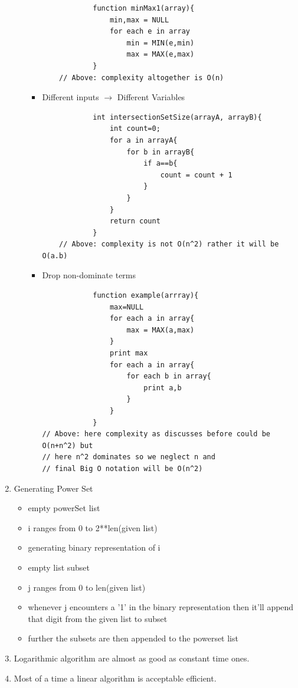 \documentclass[11pt]{article}
\begin{document}
\begin{enumerate}
\begin{itemize}
\begin{itemize}
\begin{verbatim}
            function minMax1(array){
                min,max = NULL
                for each e in array
                    min = MIN(e,min)
                    max = MAX(e,max)
            }
    // Above: complexity altogether is O(n)
                \end{verbatim}
                \item Different inputs $\rightarrow$ Different Variables
                \begin{verbatim}
            int intersectionSetSize(arrayA, arrayB){
                int count=0;
                for a in arrayA{
                    for b in arrayB{
                        if a==b{
                            count = count + 1
                        }
                    }
                }
                return count
            }
    // Above: complexity is not O(n^2) rather it will be O(a.b)
                \end{verbatim}
                \item Drop non-dominate terms
                \begin{verbatim}
            function example(arrray){
                max=NULL
                for each a in array{
                    max = MAX(a,max)
                }
                print max
                for each a in array{
                    for each b in array{
                        print a,b
                    }
                }
            }
// Above: here complexity as discusses before could be O(n+n^2) but 
// here n^2 dominates so we neglect n and 
// final Big O notation will be O(n^2)
                \end{verbatim}
            \end{itemize}
        \end{itemize}
        \item Generating Power Set
        \begin{itemize}
            \item empty powerSet list
            \item i ranges from 0 to 2**len(given list)
            \item generating binary representation of i
            \item empty list subset
            \item j ranges from 0 to len(given list)
            \item whenever j encounters a '1' in the binary representation then it'll append that digit from the given list to subset
            \item further the subsets are then appended to the powerset list
        \end{itemize}
        \item Logarithmic algorithm are almost as good as constant time ones.
        \item Most of a time a linear algorithm is acceptable efficient.
    \end{enumerate}
\end{document}
